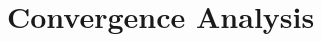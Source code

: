 \documentclass[twoside]{article}
\begin{document}
%
%
%
%

\vspace{-0.05in}
\section{Convergence Analysis}\label{sec:cnvg-an}
\vspace{-0.05in}
\end{document}
